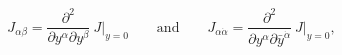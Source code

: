 \begin{equation}
J_{\alpha\beta} = \frac{\partial^2}{\partial y^\alpha \partial
y^\beta}\ J \big|_{y=0} \qquad \mbox{and} \qquad 
J_{\alpha\dot\alpha} = \frac{\partial^2}{\partial y^\alpha \partial
\bar y^{\dot\alpha}}\ J \big|_{y=0},
\end{equation}

